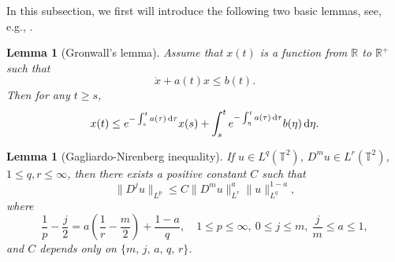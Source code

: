 \documentclass{elsarticle}
\newtheorem{lemma}[theorem]{Lemma}
\theoremstyle{definition}
\numberwithin{equation}{section}
\newcommand{\R}{\mathbb{R}}
\renewcommand{\d}{{\rm{d}}}
\begin{document}
 In this subsection, we first will introduce the following two    basic lemmas,  see, e.g., \cite{temam1,temam}.

\begin{lemma}[{Gronwall's lemma}]
Assume that $x(t)$ is  a function from $\R$ to $\R^+$ such that
\[
\dot x +a(t)x\leq b(t) .
\]
 Then for any $t\geq s $,
\[
 x(t)\leq e^{ -\int^t_s a(\tau) \, \d \tau} x(s)+\int_s^t e^{-\int^t_\eta a(\tau) \, \d \tau } b(\eta) \, \d \eta.
\]
\end{lemma}


\begin{lemma}[Gagliardo-Nirenberg inequality]  If $u\in L^q(\mathbb{T}^2)$, $D^{m}u\in L^r(\mathbb{T}^2)$, $1\leq q,r\leq\infty$, then there exists a positive constant $C$ such that
\[
 \|D^ju\|_{L^p} \leq  C \|D^mu\|_{L^r}^a\|u\|^{1-a}_{L^q},
\]
where
\begin{equation*}
\frac{1}{p}-\frac{j}{2}=a \left (\frac{1}{r}-\frac{m}{2} \right)+ \frac{1-a}{q}, \quad 1\leq p\leq\infty,~0\leq j\leq m,~\frac{j}{m}\leq a\leq1,
\end{equation*}  and
$C$ depends only on $\{m, \, j, \, a, \, q, \,r \}$.
\end{lemma}
\end{document}
